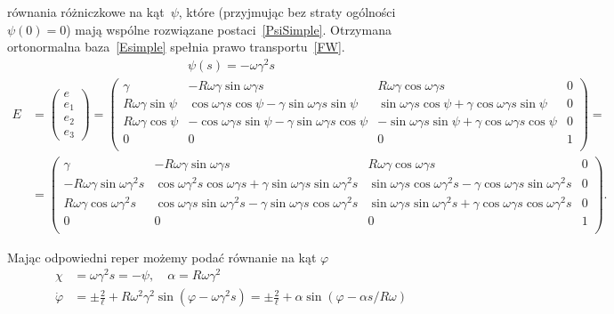 równania  różniczkowe na kąt~$\psi$, które 
(przyjmując bez straty ogólności
$\psi(0)=0$) mają wspólne rozwiązane postaci~\eqref{PsiSimple}.
Otrzymana ortonormalna baza~\eqref{Esimple} spełnia 
prawo transportu~\eqref{FW}.
\begin{align}\label{PsiSimple}
\psi (s) = -\omega \gamma^2 s
\end{align}
\begin{align}\label{Esimple}
E&=
\begin{pmatrix}
e\\
e_1\\
e_2\\
e_3
\end{pmatrix}
=
\begin{pmatrix}
\gamma  & -R\omega\gamma \sin \omega \gamma s 
& R\omega\gamma \cos\omega\gamma s         & 0 \\
R\omega\gamma \sin \psi  
&  \cos\omega\gamma s \cos\psi 
-\gamma \sin \omega\gamma s \sin\psi &  
\sin\omega\gamma s \cos\psi
+\gamma \cos\omega\gamma s\sin \psi & 0 \\
R\omega\gamma \cos\psi      &  
-\cos\omega\gamma s \sin\psi 
- \gamma \sin\omega\gamma s \cos\psi   &  
-\sin\omega\gamma s \sin\psi 
+ \gamma \cos\omega\gamma s \cos\psi & 0 \\
0 & 0 & 0 & 1 \\
\end{pmatrix} 
=
\\
&=\nonumber
\begin{pmatrix} 
\gamma  & -R\omega\gamma \sin \omega \gamma s 
& R\omega\gamma \cos\omega\gamma s         & 0 \\
-R\omega\gamma \sin\omega\gamma^2 s  
&  \cos\omega\gamma^2 s\cos\omega\gamma s + 
\gamma \sin \omega\gamma s \sin\omega\gamma^2 s &  
\sin\omega\gamma s \cos\omega\gamma^2 s 
- \gamma \cos\omega\gamma s\sin \omega\gamma^2 s & 0 \\
R\omega\gamma \cos\omega\gamma^2 s       &  
\cos\omega\gamma s \sin\omega\gamma^2 s 
- \gamma \sin\omega\gamma s \cos\omega\gamma^2 s   &  
\sin\omega\gamma s \sin\omega\gamma^2 s 
+ \gamma \cos\omega\gamma s \cos\omega\gamma^2 s & 0 \\
0 & 0 & 0 & 1 \\
\end{pmatrix}.
\end{align}

Mając odpowiedni reper możemy podać równanie na kąt $\varphi$
\begin{align*}\nonumber
\chi &= \omega \gamma^2 s = - \psi, \quad \alpha = R \omega \gamma^2 \\
\dot{\varphi} &= \pm \frac{2}{\ell} + \label{phiSimple}
R \omega^2 \gamma^2\sin (\varphi - \omega\gamma^2 s )
= \pm \frac{2}{\ell} +\alpha \sin (\varphi - \alpha s / R\omega ) 
\end{align*}

